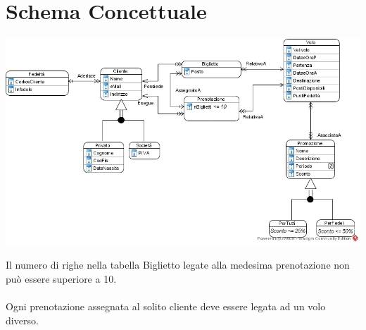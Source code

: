 \documentclass[10pt]{article}
\begin{document}
\section{Schema Concettuale}
\begin{center}
\includegraphics[scale=0.62]{Concettuale_FlyAway.jpg}
\end{center}
Il numero di righe nella tabella Biglietto legate alla medesima prenotazione non può essere superiore a 10.\\\\Ogni prenotazione assegnata al solito cliente deve essere legata ad un volo diverso.
\end{document}
